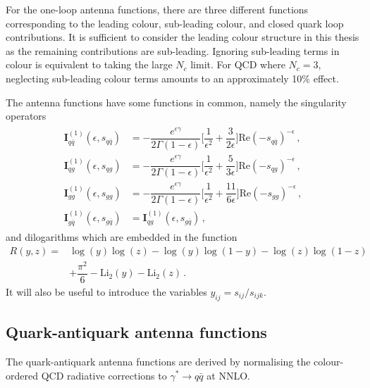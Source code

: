 \documentclass[main.tex]{subfiles}
\begin{document}
    For the one-loop antenna functions, there are three
    different functions corresponding to the leading colour,
    sub-leading colour, and closed quark loop contributions.
    It is sufficient to consider the leading colour
    structure in this thesis as the remaining contributions
    are sub-leading. Ignoring sub-leading terms in
    colour is equivalent to taking the large $N_{c}$
    limit. For QCD where $N_{c} = 3$, neglecting
    sub-leading colour terms amounts to an
    approximately 10\% effect.

    The antenna functions have some functions in common,
    namely the singularity operators
    \begin{align}\label{eqn:singularity_operators}
        \begin{split}
        \mathbf{I}_{q\bar{q}}^{(1)}(\epsilon, s_{q\bar{q}}) &= -\dfrac{e^{\epsilon\gamma}}{2\Gamma(1-\epsilon)} \bigg[\dfrac{1}{\epsilon^{2}} + \dfrac{3}{2\epsilon}\bigg] \mathrm{Re}(-s_{q\bar{q}})^{-\epsilon} \, , \\
        \mathbf{I}_{qg}^{(1)}(\epsilon, s_{qg}) &= -\dfrac{e^{\epsilon\gamma}}{2\Gamma(1-\epsilon)} \bigg[\dfrac{1}{\epsilon^{2}} + \dfrac{5}{3\epsilon}\bigg] \mathrm{Re}(-s_{qg})^{-\epsilon} \, , \\
        \mathbf{I}_{gg}^{(1)}(\epsilon, s_{gg}) &= -\dfrac{e^{\epsilon\gamma}}{2\Gamma(1-\epsilon)} \bigg[\dfrac{1}{\epsilon^{2}} + \dfrac{11}{6\epsilon}\bigg] \mathrm{Re}(-s_{gg})^{-\epsilon} \, , \\
        \mathbf{I}^{(1)}_{g\bar{q}}(\epsilon, s_{g\bar{q}}) &= \mathbf{I}_{qg}^{(1)}(\epsilon,s_{g\bar{q}}) \, ,
        \end{split}
    \end{align}
    and dilogarithms which are embedded in the function
    \begin{equation}\label{eqn:R}
        \begin{split}
        R(y, z) = &\log{(y)}\log{(z)} - \log{(y)}\log{(1-y)} - \log{(z)}\log{(1-z)} \\
        &+ \dfrac{\pi^{2}}{6} - \mathrm{Li}_{2}(y) - \mathrm{Li}_{2}(z) \, .
        \end{split}
    \end{equation}
    It will also be useful to introduce the variables $y_{ij} = s_{ij}/s_{ijk}$.

    \subsection{Quark-antiquark antenna functions}
    The quark-antiquark antenna functions are derived by normalising
    the colour-ordered QCD radiative corrections to $\gamma^{*} \rightarrow q \bar{q}$
    at NNLO.
\end{document}
